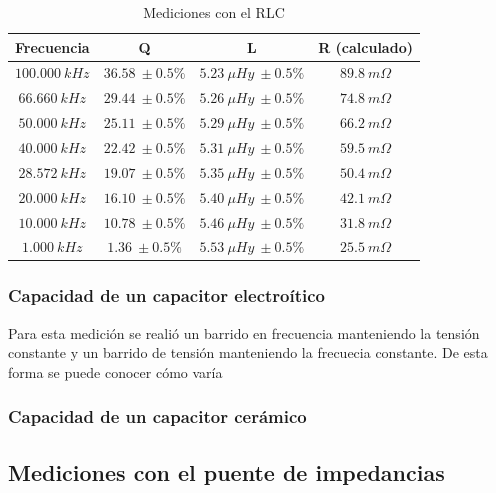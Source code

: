 \documentclass[a4paper,10pt]{article}
\begin{document}
		\begin{table}[!htp]
			\centering
			\begin{tabular}{|c|c|c|c|}
				\hline
				Frecuencia & Q & L  & R (calculado) \\
				\hline
				$100.000~kHz$& $36.58~\pm0.5\%$ & $5.23~\mu Hy~\pm0.5\%$ &$ 89.8~m\Omega$ \\
				\hline
				$66.660~kHz$& $29.44~\pm0.5\%$ & $5.26~\mu Hy~\pm0.5\%$ &$ 74.8~m\Omega$ \\
				\hline
				$50.000~kHz$& $25.11~\pm0.5\%$ & $5.29~\mu Hy~\pm0.5\%$ &$ 66.2~m\Omega$ \\
				\hline  
				$40.000~kHz$& $22.42~\pm0.5\%$ & $5.31~\mu Hy~\pm0.5\%$ &$ 59.5~m\Omega$ \\
				\hline  										
				$28.572~kHz$& $19.07~\pm0.5\%$ & $5.35~\mu Hy~\pm0.5\%$ &$ 50.4~m\Omega$ \\
				\hline
				$20.000~kHz$& $16.10~\pm0.5\%$ & $5.40~\mu Hy~\pm0.5\%$ &$ 42.1~m\Omega$ \\
				\hline  
				$10.000~kHz$& $10.78~\pm0.5\%$ & $5.46~\mu Hy~\pm0.5\%$ &$ 31.8~m\Omega$ \\
				\hline 										
				$1.000~kHz$& $1.36~\pm0.5\%$ & $5.53~\mu Hy~\pm0.5\%$ &$ 25.5~m\Omega$ \\
				\hline 	  
			\end{tabular}
			\caption{Mediciones con el RLC} \label{tabRLCbobina}
		\end{table}
				
		\subsubsection{Capacidad de un capacitor electro\'itico}	
		\indent Para esta medición se realió un barrido en frecuencia 
		manteniendo la tensión constante y un barrido de tensión manteniendo la
		frecuecia constante. De esta forma se puede conocer cómo varía 
		
		\subsubsection{Capacidad de un capacitor cer\'amico}
		
		\subsection{Mediciones con el puente de impedancias}
\end{document}
